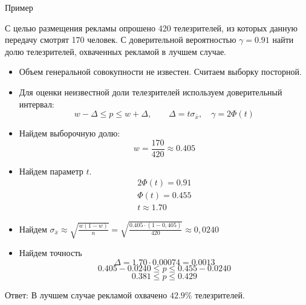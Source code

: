 \documentclass[unicode,11pt,notheorems,xcolor=table]{beamer}
\begin{document}
\begin{frame}{Пример}
    \begin{exampleblock}{}
        С целью размещения рекламы опрошено 420 телезрителей, из которых данную передачу смотрят 170 человек. 
        С доверительной вероятностью $\gamma=0.91$ найти долю телезрителей, охваченных рекламой в лучшем случае.        
    \end{exampleblock}
    \begin{itemize}
        \item Объем генеральной совокупности не известен. Считаем выборку посторной.
        \item Для оценки неизвестной доли телезрителей используем  доверительный интервал:
        $$ 
            w - \Delta \leqslant p \leqslant w + \Delta,\qquad \Delta = t\sigma_{\bar{x}}, \quad \gamma=2\Phi(t)
        $$
        \item Найдем выборочную долю: 
        $$
            w= \frac{170}{420} \approx 0.405
        $$
        \item Найдем параметр $t$. 
        \begin{gather*}
            2\Phi(t) = 0.91\\
            \Phi(t) = 0.455\\
            t \approx 1.70
        \end{gather*}    
        \item Найдем $\sigma_{\bar{x}}\approx \sqrt{\frac{w(1-w)}{n}} = \sqrt{\frac{0.405\cdot(1-0,405)}{420}}\approx 0,0240 $
        
        \item Найдем точность
        $$
            \Delta = 1.70\cdot 0.00074=0.0013
        $$
        $$ 
            0.405 - 0.0240 \leqslant p \leqslant 0.455 - 0.0240 
        $$
        $$ 
            0.381 \leqslant p \leqslant 0.429
        $$
    \end{itemize}
        Ответ: В лучшем случае рекламой охвачено $42.9\%$ телезрителей.
\end{frame}
\end{document}
